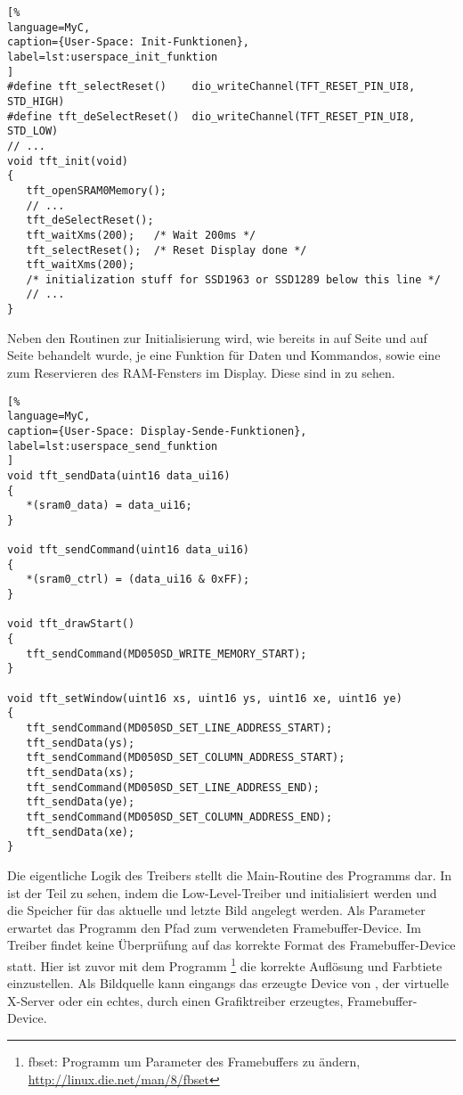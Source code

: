 \begin{lstlisting}[%
language=MyC,
caption={User-Space: Init-Funktionen},
label=lst:userspace_init_funktion
]
#define tft_selectReset()    dio_writeChannel(TFT_RESET_PIN_UI8, STD_HIGH)
#define tft_deSelectReset()  dio_writeChannel(TFT_RESET_PIN_UI8, STD_LOW)
// ...
void tft_init(void)
{
   tft_openSRAM0Memory();
   // ...
   tft_deSelectReset();
   tft_waitXms(200);   /* Wait 200ms */
   tft_selectReset();  /* Reset Display done */
   tft_waitXms(200);
   /* initialization stuff for SSD1963 or SSD1289 below this line */
   // ...
}
\end{lstlisting}
Neben den Routinen zur Initialisierung wird, wie bereits in  auf Seite \pageref{lst:apex_erster_teil} und  auf Seite \pageref{lst:send_funktion} behandelt wurde, je eine Funktion für Daten und Kommandos, sowie eine zum Reservieren des RAM-Fensters im Display. Diese sind in  zu sehen.

\begin{lstlisting}[%
language=MyC,
caption={User-Space: Display-Sende-Funktionen},
label=lst:userspace_send_funktion
]
void tft_sendData(uint16 data_ui16)
{
   *(sram0_data) = data_ui16;
}

void tft_sendCommand(uint16 data_ui16)
{
   *(sram0_ctrl) = (data_ui16 & 0xFF);
}

void tft_drawStart()
{
   tft_sendCommand(MD050SD_WRITE_MEMORY_START);
}

void tft_setWindow(uint16 xs, uint16 ys, uint16 xe, uint16 ye)
{
   tft_sendCommand(MD050SD_SET_LINE_ADDRESS_START);
   tft_sendData(ys);
   tft_sendCommand(MD050SD_SET_COLUMN_ADDRESS_START);
   tft_sendData(xs);
   tft_sendCommand(MD050SD_SET_LINE_ADDRESS_END);
   tft_sendData(ye);
   tft_sendCommand(MD050SD_SET_COLUMN_ADDRESS_END);
   tft_sendData(xe);
}
\end{lstlisting}
\newpage
Die eigentliche Logik des Treibers stellt die Main-Routine des Programms dar. In  ist der Teil zu sehen, indem die Low-Level-Treiber  und  initialisiert werden und die Speicher für das aktuelle und letzte Bild angelegt werden. Als Parameter erwartet das Programm den Pfad zum verwendeten Framebuffer-Device. Im Treiber findet keine Überprüfung auf das korrekte Format des Framebuffer-Device statt. Hier ist zuvor mit dem Programm \footnote{fbset: Programm um Parameter des Framebuffers zu ändern, \url{http://linux.die.net/man/8/fbset}} die korrekte Auflösung und Farbtiete einzustellen. Als Bildquelle kann eingangs das erzeugte Device  von , der virtuelle X-Server  oder ein echtes, durch einen Grafiktreiber erzeugtes, Framebuffer-Device. 

